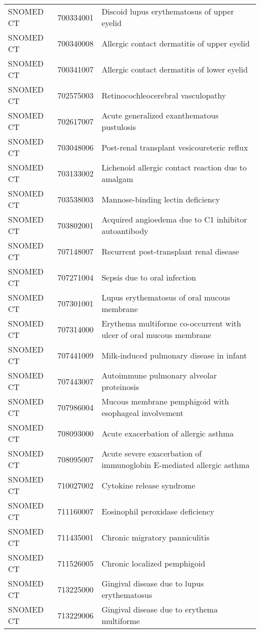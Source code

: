 \begin{longtable}{p{}p{}p{}}
  SNOMED CT & 700334001 & Discoid lupus erythematosus of upper eyelid \\ 
  SNOMED CT & 700340008 & Allergic contact dermatitis of upper eyelid \\ 
  SNOMED CT & 700341007 & Allergic contact dermatitis of lower eyelid \\ 
  SNOMED CT & 702575003 & Retinocochleocerebral vasculopathy \\ 
  SNOMED CT & 702617007 & Acute generalized exanthematous pustulosis \\ 
  SNOMED CT & 703048006 & Post-renal transplant vesicoureteric reflux \\ 
  SNOMED CT & 703133002 & Lichenoid allergic contact reaction due to amalgam \\ 
  SNOMED CT & 703538003 & Mannose-binding lectin deficiency \\ 
  SNOMED CT & 703802001 & Acquired angioedema due to C1 inhibitor autoantibody \\ 
  SNOMED CT & 707148007 & Recurrent post-transplant renal disease \\ 
  SNOMED CT & 707271004 & Sepsis due to oral infection \\ 
  SNOMED CT & 707301001 & Lupus erythematosus of oral mucous membrane \\ 
  SNOMED CT & 707314000 & Erythema multiforme co-occurrent with ulcer of oral mucous membrane \\ 
  SNOMED CT & 707441009 & Milk-induced pulmonary disease in infant \\ 
  SNOMED CT & 707443007 & Autoimmune pulmonary alveolar proteinosis \\ 
  SNOMED CT & 707986004 & Mucous membrane pemphigoid with esophageal involvement \\ 
  SNOMED CT & 708093000 & Acute exacerbation of allergic asthma \\ 
  SNOMED CT & 708095007 & Acute severe exacerbation of immunoglobin E-mediated allergic asthma \\ 
  SNOMED CT & 710027002 & Cytokine release syndrome \\ 
  SNOMED CT & 711160007 & Eosinophil peroxidase deficiency \\ 
  SNOMED CT & 711435001 & Chronic migratory panniculitis \\ 
  SNOMED CT & 711526005 & Chronic localized pemphigoid \\ 
  SNOMED CT & 713225000 & Gingival disease due to lupus erythematosus \\ 
  SNOMED CT & 713229006 & Gingival disease due to erythema multiforme \\ 

\end{longtable}

